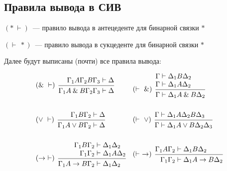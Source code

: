 \documentclass[main]{subfiles}
\begin{document}
\subsection{Правила вывода в СИВ}

$(*\ \vdash)$~--- правило вывода в антецеденте для бинарной связки $*$

$(\vdash \ *)$~--- правило вывода в сукцеденте для бинарной связки $*$

Далее будут выписаны (почти) все правила вывода:

\begin{align*}
     & \begin{prooftree}
           \hypo{\Gamma_1 A\Gamma_2 B\Gamma_3 &\vdash \Delta}
           \infer[left label=$(\and \ \vdash)$]1{\Gamma_1 A \and B \Gamma_2 \Gamma_3 &\vdash \Delta}
       \end{prooftree}       &
     & \begin{prooftree}
           \hypo{ \Gamma &\vdash \Delta_1 B\Delta_2}
           \infer[no rule]1{ \Gamma &\vdash \Delta_1A\Delta_2 }
           \infer[left label=$(\vdash \ \and)$]1{ \Gamma &\vdash \Delta_1 A \and B \Delta_2}
       \end{prooftree}
    \\
    \\
     & \begin{prooftree}
           \hypo{\Gamma_1 B\Gamma_2 &\vdash \Delta}
           \infer[left label=$(\lor \ \vdash)$]1{\Gamma_1 A\lor B\Gamma_2 &\vdash \Delta}
       \end{prooftree}                  &
     & \begin{prooftree}
           \hypo{\Gamma &\vdash \Delta_1A\Delta_2B\Delta_3}
           \infer[left label=$(\vdash \ \lor)$]1{\Gamma &\vdash \Delta_1 A\lor B\Delta_2\Delta_3}
       \end{prooftree}
    \\
    \\
     & \begin{prooftree}
           \hypo{\Gamma_1B\Gamma_2 &\vdash\Delta_1\Delta_2}
           \infer[no rule]1{\Gamma_1\Gamma_2 &\vdash \Delta_1 A \Delta_2}
           \infer[left label=$(\to \ \vdash)$]1{\Gamma_1 A\to B\Gamma_2 &\vdash \Delta_1 \Delta_2}
       \end{prooftree}         &
     & \begin{prooftree}
           \hypo{\Gamma_1A\Gamma_2 &\vdash \Delta_1B\Delta_2}
           \infer[left label=$(\vdash \ \to)$]1{\Gamma_1\Gamma_2 &\vdash \Delta_1A\to B \Delta_2}

\end{prooftree}
\end{align*}
\end{document}
